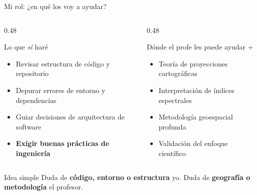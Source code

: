 \documentclass[aspectratio=169]{beamer}
\begin{document}
\begin{frame}{Mi rol: ¿en qué los voy a ayudar?}
  \begin{columns}[T]
    \begin{column}{0.48\textwidth}
      \begin{conceptbox}{\faCode\enspace Lo que \textit{sí} haré}
        \begin{itemize}\small\setlength\itemsep{1pt}
          \item Revisar estructura de código y repositorio
          \item Depurar errores de entorno y dependencias
          \item Guiar decisiones de arquitectura de software
          \item \textbf{Exigir buenas prácticas de ingeniería}
        \end{itemize}
      \end{conceptbox}
    \end{column}
    \begin{column}{0.48\textwidth}
      \begin{conceptbox}{\faGlobeAmericas\enspace Dónde el profe les puede ayudar +}
        \begin{itemize}\small\setlength\itemsep{1pt}
          \item Teoría de proyecciones cartográficas
          \item Interpretación de índices espectrales
          \item Metodología geoespacial profunda
          \item Validación del enfoque científico
        \end{itemize}
      \end{conceptbox}
    \end{column}
  \end{columns}
  \vspace{0.25cm}
  \begin{alertblock}{\faLightbulb\enspace Idea simple}
    \centering\small
    Duda de \textbf{código, entorno o estructura} \textrightarrow{} yo.\quad
    Duda de \textbf{geografía o metodología} \textrightarrow{} el profesor.
  \end{alertblock}
\end{frame}
\end{document}

